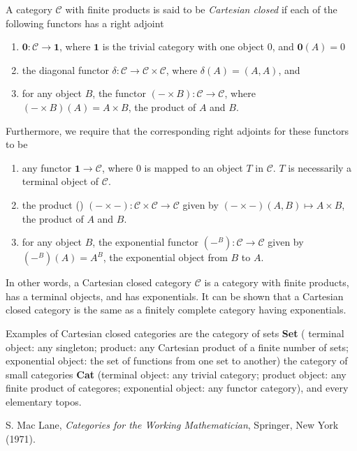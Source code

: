 \documentclass[12pt]{article}
\begin{document}
A category $\mathcal{C}$ with finite products is said to be \emph{Cartesian closed} if each of the following functors has a right adjoint
\begin{enumerate}
\item $\textbf{0}:\mathcal{C}\to \textbf{1}$, where $\textbf{1}$ is the trivial category with one object $0$, and $\textbf{0}(A)=0$
\item the diagonal functor $\delta: \mathcal{C}\to \mathcal{C}\times\mathcal{C}$, where $\delta(A)=(A,A)$, and
\item for any object $B$, the functor $(-\times B):\mathcal{C}\to\mathcal{C}$, where $(-\times B)(A)=A\times B$, the product of $A$ and $B$.
\end{enumerate}
Furthermore, we require that the corresponding right adjoints for these functors to be
\begin{enumerate}
\item any functor $\textbf{1}\to\mathcal{C}$, where $0$ is mapped to an object $T$ in $\mathcal{C}$.  $T$ is necessarily a terminal object of $\mathcal{C}$.  
\item the product () $(-\times -): \mathcal{C} \times \mathcal{C}\to \mathcal{C}$ given by $(-\times -)(A,B)\mapsto A\times B$, the product of $A$ and $B$.
\item for any object $B$, the exponential functor $(-^B):\mathcal{C}\to\mathcal{C}$ given by $(-^B)(A)=A^B$, the exponential object from $B$ to $A$.
\end{enumerate}

In other words, a Cartesian closed category $\mathcal{C}$ is a category with finite products, has a terminal objects, and has exponentials.  It can be shown that a Cartesian closed category is the same as a finitely complete category having exponentials.

Examples of Cartesian closed categories are the category of sets \textbf{Set} ( terminal object: any singleton; product: any Cartesian product of a finite number of sets; exponential object: the set of functions from one set to another)  the category of small categories \textbf{Cat} (terminal object: any trivial category; product object: any finite product of categores; exponential object: any functor category), and every elementary topos.

\begin{thebibliography}{8}
 S. Mac Lane, {\em Categories for the Working Mathematician}, Springer, New York (1971).
\end{thebibliography}
\end{document}
